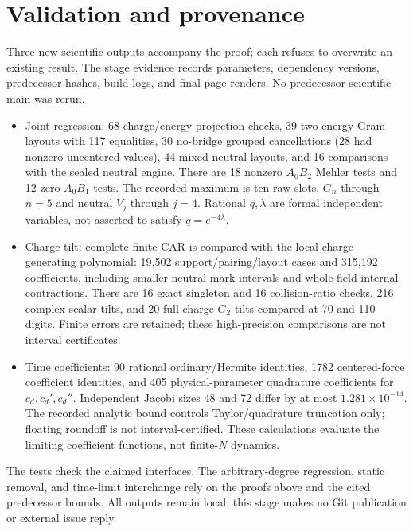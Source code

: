 \documentclass[11pt]{article}
\begin{document}
\newpage
\section{Validation and provenance}
Three new scientific outputs accompany the proof; each refuses to
overwrite an existing result. The stage evidence records parameters,
dependency versions, predecessor hashes, build logs, and final page
renders. No predecessor scientific main was rerun.
\begin{itemize}
\item Joint regression: 68 charge/energy projection checks, 39
two-energy Gram layouts with 117 equalities, 30 no-bridge grouped
cancellations (28 had nonzero uncentered values), 44 mixed-neutral
layouts, and 16 comparisons with the sealed neutral engine. There
are 18 nonzero $A_0B_2$ Mehler tests and 12 zero $A_0B_1$ tests.
The recorded maximum is ten raw slots, $G_n$ through $n=5$ and
neutral $V_j$ through $j=4$. Rational $q,\lambda$ are formal
independent variables, not asserted to satisfy $q=e^{-4\lambda}$.
\item Charge tilt: complete finite CAR is compared with the local
charge-generating polynomial: 19,502 support/pairing/layout cases
and 315,192 coefficients, including smaller neutral mark intervals
and whole-field internal contractions. There are 16 exact singleton
and 16 collision-ratio checks, 216 complex scalar tilts, and 20
full-charge $G_2$ tilts compared at 70 and 110 digits. Finite errors
are retained; these high-precision comparisons are not interval certificates.
\item Time coefficients: 90 rational ordinary/Hermite identities,
1782 centered-force coefficient identities, and 405 physical-parameter
quadrature coefficients for $c_d,c_d',c_d''$. Independent Jacobi
sizes 48 and 72 differ by at most $1.281\times10^{-14}$.
The recorded analytic bound controls Taylor/quadrature truncation
only; floating roundoff is not interval-certified. These calculations
evaluate the limiting coefficient functions, not finite-$N$ dynamics.
\end{itemize}
The tests check the claimed interfaces. The arbitrary-degree
regression, static removal, and time-limit interchange rely on the
proofs above and the cited predecessor bounds. All outputs remain
local; this stage makes no Git publication or external issue reply.
\end{document}
